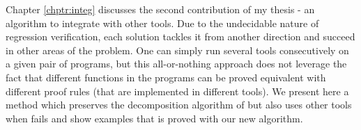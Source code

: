 Chapter \ref{chptr:integ} discusses the second contribution of my thesis - an algorithm to integrate  with other tools. Due to the undecidable nature of regression verification, each solution tackles it from another direction and succeed in other areas of the problem. One can simply run several tools consecutively on a given pair of programs, but this all-or-nothing approach does not leverage the fact that different functions in the programs can be proved equivalent with different proof rules (that are implemented in different tools). We present here a method which preserves the decomposition algorithm of  but also uses other tools when  fails and show examples that is proved with our new algorithm.


